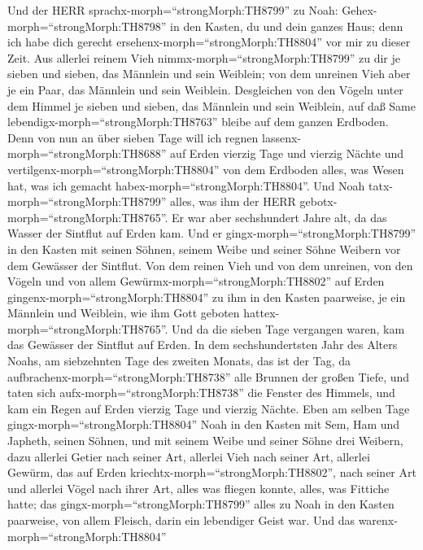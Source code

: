  Und der HERR sprachx-morph=``strongMorph:TH8799'' zu Noah:
Gehex-morph=``strongMorph:TH8798'' in den Kasten, du und dein ganzes
Haus; denn ich habe dich gerecht ersehenx-morph=``strongMorph:TH8804''
vor mir zu dieser Zeit.  Aus allerlei reinem Vieh
nimmx-morph=``strongMorph:TH8799'' zu dir je sieben und sieben, das
Männlein und sein Weiblein; von dem unreinen Vieh aber je ein Paar, das
Männlein und sein Weiblein.  Desgleichen von den Vögeln
unter dem Himmel je sieben und sieben, das Männlein und sein Weiblein,
auf daß Same lebendigx-morph=``strongMorph:TH8763'' bleibe auf dem
ganzen Erdboden.  Denn von nun an über sieben Tage will ich
regnen lassenx-morph=``strongMorph:TH8688'' auf Erden vierzig Tage und
vierzig Nächte und vertilgenx-morph=``strongMorph:TH8804'' von dem
Erdboden alles, was Wesen hat, was ich gemacht
habex-morph=``strongMorph:TH8804''.  Und Noah
tatx-morph=``strongMorph:TH8799'' alles, was ihm der HERR
gebotx-morph=``strongMorph:TH8765''.  Er war aber
sechshundert Jahre alt, da das Wasser der Sintflut auf Erden kam.
 Und er gingx-morph=``strongMorph:TH8799'' in den Kasten mit
seinen Söhnen, seinem Weibe und seiner Söhne Weibern vor dem Gewässer
der Sintflut.  Von dem reinen Vieh und von dem unreinen, von
den Vögeln und von allem Gewürmx-morph=``strongMorph:TH8802'' auf Erden
 gingenx-morph=``strongMorph:TH8804'' zu ihm in den Kasten
paarweise, je ein Männlein und Weiblein, wie ihm Gott geboten
hattex-morph=``strongMorph:TH8765''.  Und da die sieben
Tage vergangen waren, kam das Gewässer der Sintflut auf Erden.
 In dem sechshundertsten Jahr des Alters Noahs, am
siebzehnten Tage des zweiten Monats, das ist der Tag, da
aufbrachenx-morph=``strongMorph:TH8738'' alle Brunnen der großen Tiefe,
und taten sich aufx-morph=``strongMorph:TH8738'' die Fenster des
Himmels,  und kam ein Regen auf Erden vierzig Tage und
vierzig Nächte.  Eben am selben Tage
gingx-morph=``strongMorph:TH8804'' Noah in den Kasten mit Sem, Ham und
Japheth, seinen Söhnen, und mit seinem Weibe und seiner Söhne drei
Weibern,  dazu allerlei Getier nach seiner Art, allerlei
Vieh nach seiner Art, allerlei Gewürm, das auf Erden
kriechtx-morph=``strongMorph:TH8802'', nach seiner Art und allerlei
Vögel nach ihrer Art, alles was fliegen konnte, alles, was Fittiche
hatte;  das gingx-morph=``strongMorph:TH8799'' alles zu
Noah in den Kasten paarweise, von allem Fleisch, darin ein lebendiger
Geist war.  Und das warenx-morph=``strongMorph:TH8804''
